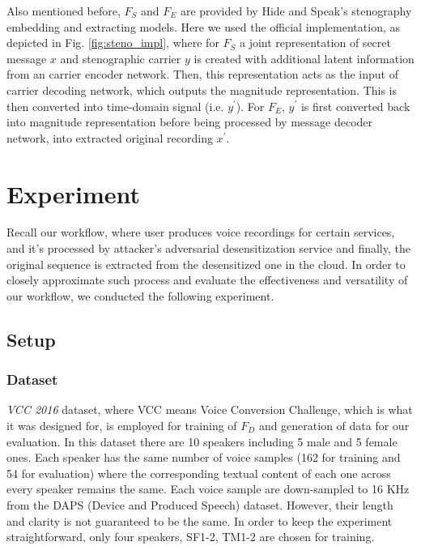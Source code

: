 \documentclass[journal]{IEEEtran} %
\begin{document}
Also mentioned before, $F_S$ and $F_E$ are provided by Hide and Speak's stenography embedding and extracting models. Here we used the official implementation, as depicted in Fig. \ref{fig:steno_impl}, where for $F_S$ a joint representation of secret message $x$ and stenographic carrier $y$ is created with additional latent information from an carrier encoder network. Then, this representation acts as the input of carrier decoding network, which outputs the magnitude representation. This is then converted into time-domain signal (i.e. $y^{\prime}$). For $F_E$, $y^{\prime}$ is first converted back into magnitude representation before being processed by message decoder network, into extracted original recording $x^{\prime}$.

\section{Experiment}
\label{seg:expriment}

Recall our workflow, where user produces voice recordings for certain services, and it's processed by attacker's adversarial desensitization service and finally, the original sequence is extracted from the desensitized one in the cloud. In order to closely approximate such process and evaluate the effectiveness and versatility of our workflow, we conducted the following experiment.

\subsection{Setup}

\subsubsection{Dataset}

\textit{VCC 2016} dataset, where VCC means Voice Conversion Challenge\cite{vcc2016, vcc2016eval, vcc2016mss}, which is what it was designed for, is employed for training of $F_D$ and generation of data for our evaluation. In this dataset there are 10 speakers including 5 male and 5 female ones. Each speaker has the same number of voice samples (162 for training and 54 for evaluation) where the corresponding textual content of each one across every speaker remains the same. Each voice sample are down-sampled to 16 KHz from the DAPS (Device and Produced Speech) dataset. However, their length and clarity is not guaranteed to be the same. In order to keep the experiment straightforward, only four speakers, SF1-2, TM1-2 are chosen for training.
\end{document}
